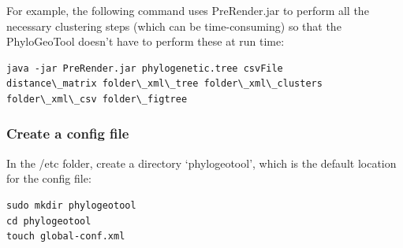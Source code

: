 \documentclass[a4paper, 11pt]{article} %
\begin{document}
For example, the following command uses PreRender.jar to perform all the necessary clustering steps (which can be time-consuming) so that the PhyloGeoTool doesn't have to perform these at run time: 
\begin{verbatim}
java -jar PreRender.jar phylogenetic.tree csvFile 
distance\_matrix folder\_xml\_tree folder\_xml\_clusters 
folder\_xml\_csv folder\_figtree
\end{verbatim}


\subsubsection{Create a config file}

In the /etc folder, create a directory `phylogeotool', which is the default location for the config file:
\begin{verbatim}
sudo mkdir phylogeotool
cd phylogeotool
touch global-conf.xml
\end{verbatim}



\end{document}
